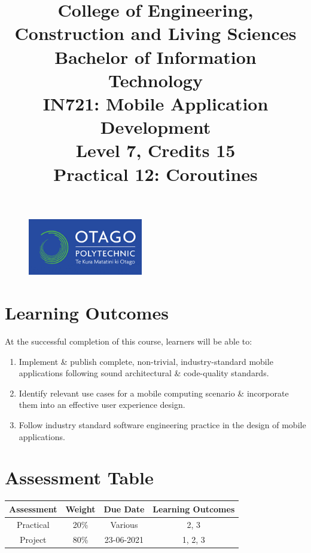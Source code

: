 \documentclass{article}
\author{}
\begin{document}
\begin{figure}
    \centering
    \includegraphics[width=50mm]{../img/logo.png}
\end{figure}

\title{College of Engineering, Construction and Living Sciences\\Bachelor of Information Technology\\IN721: Mobile Application Development\\Level 7, Credits 15\\\textbf{Practical 12: Coroutines}}
\date{}
\maketitle

\section*{Learning Outcomes}
At the successful completion of this course, learners will be able to: 
\begin{enumerate}
	\item Implement \& publish complete, non-trivial, industry-standard mobile applications following sound architectural \& code-quality standards.
	\item Identify relevant use cases for a mobile computing scenario \& incorporate them into an effective user experience design.
	\item Follow industry standard software engineering practice in the design of mobile applications.
\end{enumerate} 


\section*{Assessment Table}
\renewcommand{\arraystretch}{1.5}	
\begin{tabular}{|c|c|c|c|}
	\hline
	\textbf{Assessment} & \textbf{Weight} & \textbf{Due Date} & \textbf{Learning Outcomes} \\ \hline
	Practical           & 20\%            & Various           & 2, 3                       \\ \hline
	Project             & 80\%            & 23-06-2021        & 1, 2, 3                    \\ \hline
\end{tabular} 

 
\end{document}
